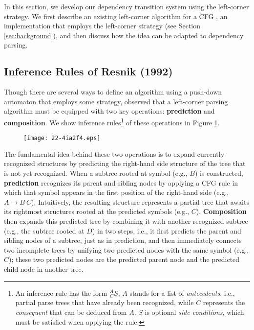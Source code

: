 \documentclass[english]{jnlp_1.4}
\begin{document}
In this section, we develop our dependency transition system using the left-corner strategy.
We first describe an existing left-corner algorithm for a CFG \cite{conf/coling/Resnik92}, an implementation that employs the left-corner strategy (see Section \ref{sec:background}), and then discuss how the idea can be adapted to dependency parsing.


\subsection{Inference Rules of Resnik (1992)}
\label{sec:resnik}

Though there are several ways to define an algorithm using a push-down automaton that employs some strategy,  observed that a left-corner parsing algorithm must be equipped with two key operations: {\bf prediction} and {\bf composition}.
We show inference rules\footnote{An inference rule has the form $\displaystyle \frac{A}{C}S$; $A$ stands for a list of {\it antecedents}, i.e., partial parse trees that have already been recognized, while $C$ represents the {\it consequent} that can be deduced from $A$. $S$ is optional {\it side conditions}, which must be satisfied when applying the rule.} of these operations in Figure \ref{fig:inference}.

\begin{figure}[t]
\begin{center}
\texttt{[image: 22-4ia2f4.eps]}
\end{center}
\label{fig:inference}
\end{figure}

The fundamental idea behind these two operations is to expand currently recognized structures by predicting the right-hand side structure of the tree that is not yet recognized.
When a subtree rooted at symbol (e.g., $B$) is constructed, {\bf prediction} recognizes its parent and sibling nodes by applying a CFG rule in which that symbol appears in the first position of the right-hand side (e.g., $A \rightarrow B~C$).
Intuitively, the resulting structure represents a partial tree that awaits its rightmost structures rooted at the predicted symbols (e.g., $C$).
{\bf Composition} then expands this predicted tree by combining it with another recognized subtree (e.g., the subtree rooted at $D$) in two steps, i.e., it first predicts the parent and sibling nodes of a subtree, just as in prediction, and then immediately connects two incomplete trees by unifying two predicted nodes with the same symbol (e.g., $C$);
these two predicted nodes are the predicted parent node and the predicted child node in another tree.
\end{document}

